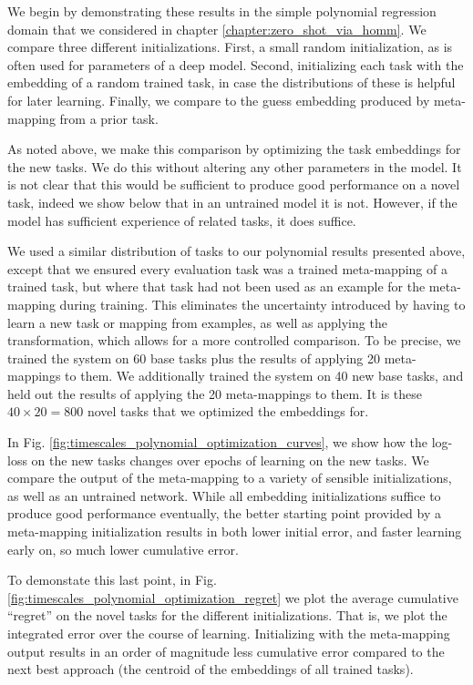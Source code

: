 We begin by demonstrating these results in the simple polynomial regression domain that we considered in chapter \ref{chapter:zero_shot_via_homm}. We compare three different initializations. First, a small random initialization, as is often used for parameters of a deep model. Second, initializing each task with the embedding of a random trained task, in case the distributions of these is helpful for later learning. Finally, we compare to the guess embedding produced by meta-mapping from a prior task. \par 
As noted above, we make this comparison by optimizing the task embeddings for the new tasks. We do this without altering any other parameters in the model. It is not clear that this would be sufficient to produce good performance on a novel task, indeed we show below that in an untrained model it is not. However, if the model has sufficient experience of related tasks, it does suffice. \par 
We used a similar distribution of tasks to our polynomial results presented above, except that we ensured every evaluation task was a trained meta-mapping of a trained task, but where that task had not been used as an example for the meta-mapping during training. This eliminates the uncertainty introduced by having to learn a new task or mapping from examples, as well as applying the transformation, which allows for a more controlled comparison. To be precise, we trained the system on 60 base tasks plus the results of applying 20 meta-mappings to them. We additionally trained the system on 40 new base tasks, and held out the results of applying the 20 meta-mappings to them. It is these \(40 \times 20 = 800\) novel tasks that we optimized the embeddings for. \par 
In Fig. \ref{fig:timescales_polynomial_optimization_curves}, we show how the log-loss on the new tasks changes over epochs of learning on the new tasks. We compare the output of the meta-mapping to a variety of sensible initializations, as well as an untrained network. While all embedding initializations suffice to produce good performance eventually, the better starting point provided by a meta-mapping initialization results in both lower initial error, and faster learning early on, so much lower cumulative error. \par
To demonstate this last point, in Fig. \ref{fig:timescales_polynomial_optimization_regret} we plot the average cumulative ``regret'' on the novel tasks for the different initializations. That is, we plot the integrated error over the course of learning. Initializing with the meta-mapping output results in an order of magnitude less cumulative error compared to the next best approach (the centroid of the embeddings of all trained tasks). \par
